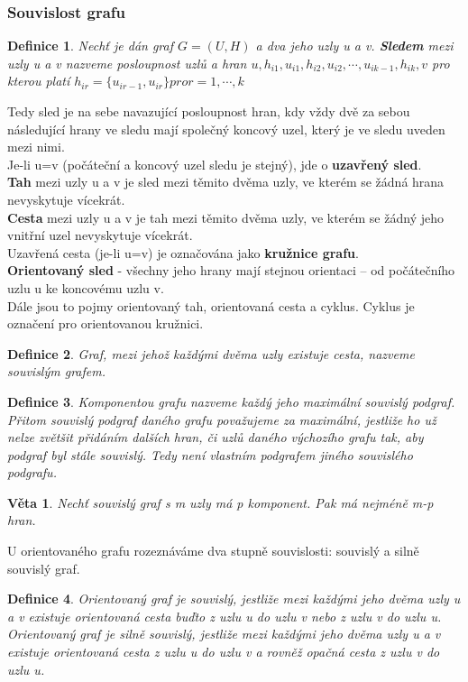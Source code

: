 \documentclass[10pt,a4paper]{article}
\newtheorem{veta}{Věta}
\newtheorem{definition}{Definice}
\begin{document}
\subsubsection{Souvislost grafu}
\begin{definition}
Nechť je dán graf $G = (U, H)$ a dva jeho uzly u a v. \textbf{Sledem} mezi uzly u a v nazveme posloupnost uzlů a hran $u, h_{i1}, u_{i1}, h_{i2}, u_{i2}, \cdots , u_{ik-1}, h_{ik}, v$ pro kterou platí $h_{ir} = \{u_{ir-1}, u_{ir} \} pro r = 1,\cdots, k $
\end{definition}
Tedy sled je na sebe navazující posloupnost hran, kdy vždy dvě za sebou následující hrany ve sledu mají společný koncový uzel, který je ve sledu uveden mezi nimi. \\
Je-li u=v (počáteční a koncový uzel sledu je stejný), jde o \textbf{uzavřený sled}. \\
\textbf{Tah} mezi uzly u a v je sled mezi těmito dvěma uzly, ve kterém se žádná hrana nevyskytuje vícekrát. \\
\textbf{Cesta} mezi uzly u a v je tah mezi těmito dvěma uzly, ve kterém se žádný jeho vnitřní uzel nevyskytuje vícekrát. \\
Uzavřená cesta (je-li u=v) je označována jako \textbf{kružnice grafu}. \\
\textbf{Orientovaný sled} - všechny jeho hrany mají stejnou orientaci – od počátečního uzlu u ke koncovému uzlu v. \\
Dále jsou to pojmy orientovaný tah, orientovaná cesta a cyklus. Cyklus je označení pro orientovanou kružnici.
\begin{definition}
Graf, mezi jehož každými dvěma uzly existuje cesta, nazveme souvislým grafem.
\end{definition}
\begin{definition}
Komponentou grafu nazveme každý jeho maximální souvislý podgraf. Přitom souvislý podgraf daného grafu považujeme za maximální, jestliže ho už nelze zvětšit přidáním dalších hran, či uzlů daného výchozího grafu tak, aby podgraf byl stále souvislý. Tedy není vlastním podgrafem jiného souvislého podgrafu.
\end{definition}
\begin{veta}
Nechť souvislý graf s m uzly má p komponent. Pak má nejméně m-p hran.
\end{veta}
U orientovaného grafu rozeznáváme dva stupně souvislosti: souvislý a silně souvislý graf.
\begin{definition}
Orientovaný graf je souvislý, jestliže mezi každými jeho dvěma uzly u a v existuje orientovaná cesta buďto z uzlu u do uzlu v nebo z uzlu v do uzlu u.
Orientovaný graf je silně souvislý, jestliže mezi každými jeho dvěma uzly u a v existuje orientovaná cesta z uzlu u do uzlu v a rovněž opačná cesta z uzlu v do uzlu u.
\end{definition}
\end{document}
